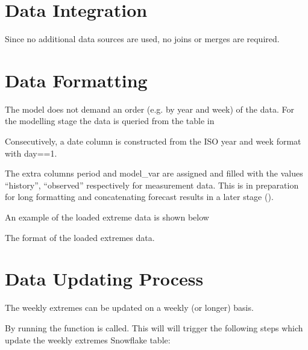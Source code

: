 \documentclass[letterpaper,10pt,english]{sphinxmanual}
\let\sphinxpxdimen\pdfpxdimen\else\newdimen\sphinxpxdimen
\begin{document}
\section{Data Integration}
\label{\detokenize{data_preparation:data-integration}}
Since no additional data sources are used, no joins or merges are required.


\section{Data Formatting}
\label{\detokenize{data_preparation:data-formatting}}
The model does not demand an order (e.g. by year and week) of the data.
For the modelling stage the data is queried from the table in {\hyperref[\detokenize{data_preparation:data-construction}]{}}

Consecutively, a date column is constructed from the ISO year and week format with day==1.

The extra columns period and model\_var are assigned and filled with the values “history”, “observed” respectively for measurement data.
This is in preparation for long formatting and concatenating forecast results in a later stage ({\hyperref[\detokenize{autoapi/src/preprocess/preprocess/index:src.preprocess.preprocess.format_data}]{}}).

An example of the loaded extreme data is shown below

\noindent{\hspace*{\fill}\sphinxincludegraphics[width=800\sphinxpxdimen]{{loaded_extremes}.png}\hspace*{\fill}}

The format of the loaded extremes data.


\section{Data Updating Process}
\label{\detokenize{data_preparation:data-updating-process}}
The weekly extremes can be updated on a weekly (or longer) basis.

By running {\hyperref[\detokenize{autoapi/src/preprocess/update_extremes/index:module-src.preprocess.update_extremes}]{}} the function {\hyperref[\detokenize{autoapi/src/utils/snowflake/index:src.utils.snowflake.update_week_extremes}]{}} is called.
This will will trigger the following steps which update the weekly extremes Snowflake table:
\end{document}
